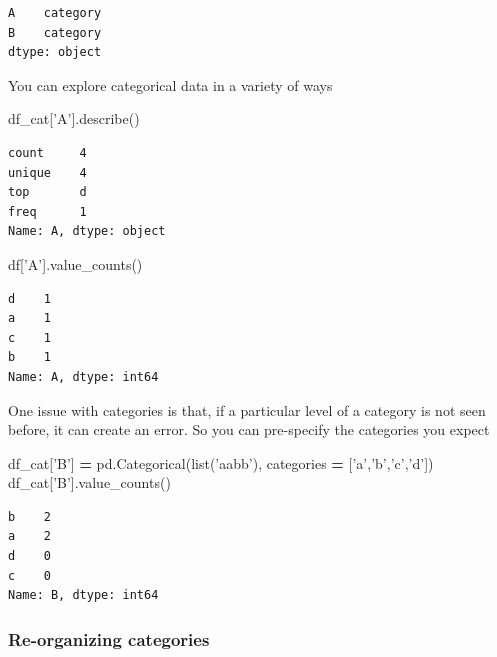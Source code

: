 \documentclass[
  letterpaper,
]{scrbook}
\newenvironment{Shaded}{\begin{snugshade}}{\end{snugshade}}
\newcommand{\BuiltInTok}[1]{#1}
\newcommand{\NormalTok}[1]{#1}
\newcommand{\OperatorTok}[1]{\textcolor[rgb]{0.81,0.36,0.00}{\textbf{#1}}}
\newcommand{\StringTok}[1]{\textcolor[rgb]{0.31,0.60,0.02}{#1}}
\begin{document}
\begin{verbatim}
A    category
B    category
dtype: object
\end{verbatim}

You can explore categorical data in a variety of ways

\begin{Shaded}
\begin{Highlighting}[]
\NormalTok{df_cat[}\StringTok{'A'}\NormalTok{].describe()}
\end{Highlighting}
\end{Shaded}

\begin{verbatim}
count     4
unique    4
top       d
freq      1
Name: A, dtype: object
\end{verbatim}

\begin{Shaded}
\begin{Highlighting}[]
\NormalTok{df[}\StringTok{'A'}\NormalTok{].value_counts()}
\end{Highlighting}
\end{Shaded}

\begin{verbatim}
d    1
a    1
c    1
b    1
Name: A, dtype: int64
\end{verbatim}

One issue with categories is that, if a particular level of a category is not seen before, it can create an error. So you can pre-specify the categories you expect

\begin{Shaded}
\begin{Highlighting}[]
\NormalTok{df_cat[}\StringTok{'B'}\NormalTok{] }\OperatorTok{=}\NormalTok{ pd.Categorical(}\BuiltInTok{list}\NormalTok{(}\StringTok{'aabb'}\NormalTok{), categories }\OperatorTok{=}\NormalTok{ [}\StringTok{'a'}\NormalTok{,}\StringTok{'b'}\NormalTok{,}\StringTok{'c'}\NormalTok{,}\StringTok{'d'}\NormalTok{])}
\NormalTok{df_cat[}\StringTok{'B'}\NormalTok{].value_counts()}
\end{Highlighting}
\end{Shaded}

\begin{verbatim}
b    2
a    2
d    0
c    0
Name: B, dtype: int64
\end{verbatim}

\hypertarget{re-organizing-categories}{%
\subsubsection{Re-organizing categories}\label{re-organizing-categories}}
\end{document}

